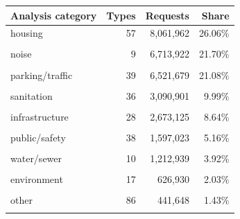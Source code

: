 \begin{tabular}{@{}lrrr@{}}
\toprule
Analysis category & Types & Requests & Share \\
\midrule
housing & 57 & 8,061,962 & 26.06\% \\\\
noise & 9 & 6,713,922 & 21.70\% \\\\
parking/traffic & 39 & 6,521,679 & 21.08\% \\\\
sanitation & 36 & 3,090,901 & 9.99\% \\\\
infrastructure & 28 & 2,673,125 & 8.64\% \\\\
public/safety & 38 & 1,597,023 & 5.16\% \\\\
water/sewer & 10 & 1,212,939 & 3.92\% \\\\
environment & 17 & 626,930 & 2.03\% \\\\
other & 86 & 441,648 & 1.43\% \\\\
\bottomrule
\end{tabular}
